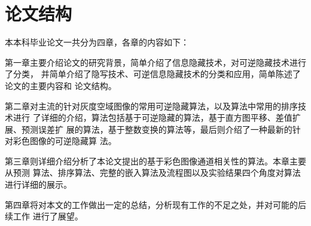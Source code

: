 \section{论文结构}
\label{s:thesis_structure}
本本科毕业论文一共分为四章，各章的内容如下：
\par
第一章主要介绍论文的研究背景，简单介绍了信息隐藏技术，对可逆隐藏技术进行了分类，
并简单介绍了隐写技术、可逆信息隐藏技术的分类和应用，简单陈述了论文的主要内容和
论文结构。
\par
第二章对主流的针对灰度空域图像的常用可逆隐藏算法，以及算法中常用的排序技术进行
了详细的介绍，算法包括基于可逆隐藏的算法，基于直方图平移、差值扩展、预测误差扩
展的算法，基于整数变换的算法等，最后则介绍了一种最新的针对彩色图像的可逆隐藏算
法。
\par
第三章则详细介绍分析了本论文提出的基于彩色图像通道相关性的算法。本章主要从预测
算法、排序算法、完整的嵌入算法及流程图以及实验结果四个角度对算法进行详细的展示。
\par
第四章将对本文的工作做出一定的总结，分析现有工作的不足之处，并对可能的后续工作
进行了展望。
\par
